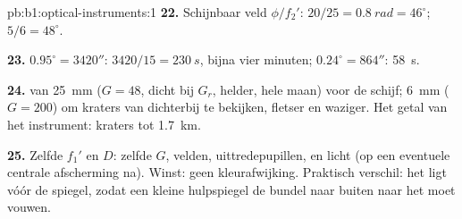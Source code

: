 \begin{solution}{pb:b1:optical-instruments:1}
\textbf{22.} Schijnbaar veld $\phi/f_2'$: $20/25 = \qty{0.8}{rad} = 46^\circ$;
$5/6 = 48^\circ$.

\textbf{23.} $0.95^\circ = 3420''$: $3420/15 = \qty{230}{s}$, bijna vier
minuten; $0.24^\circ = 864''$: \qty{58}{s}.

\textbf{24.}  van \qty{25}{mm} ($G = 48$, dicht bij $G_r$, helder, hele
maan) voor de schijf; \qty{6}{mm} ($G = 200$) om kraters van dichterbij te bekijken,
fletser en waziger. Het getal van het instrument: kraters tot
\qty{1.7}{km}.

\textbf{25.} Zelfde $f_1'$ en $D$: zelfde $G$, velden, uittredepupillen,
 en licht (op een eventuele centrale afscherming na). Winst: geen
kleurafwijking. Praktisch verschil: het  ligt vóór de spiegel,
zodat een kleine hulpspiegel de bundel naar buiten naar het  moet
vouwen.
\end{solution}
